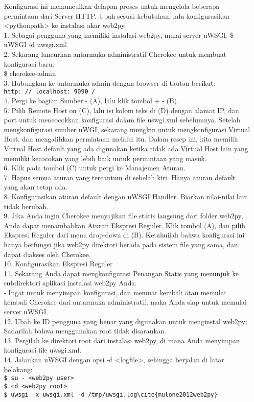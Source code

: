 \documentclass[12pt, times new roman, a4paper]{Article}
\begin{document}
	Konfigurasi ini memunculkan delapan proses untuk mengelola beberapa permintaan dari
Server HTTP. Ubah sesuai kebutuhan, lalu konfigurasikan <pythonpath> ke instalasi
akar web2py.\\
1.	Sebagai pengguna yang memiliki instalasi web2py, mulai server uWSGI: \$ uWSGI -d uwsgi.xml\\
2.	Sekarang luncurkan antarmuka administratif Cherokee untuk membuat konfigurasi baru:\\
\$ cherokee-admin\\
3.	Hubungkan ke antarmuka admin dengan browser di tautan berikut:\\
\verb|http: // localhost: 9090 /|\\
4.	Pergi ke bagian Sumber - (A), lalu klik tombol + - (B).\\
5.	Pilih Remote Host on (C), lalu isi kolom teks di (D) dengan alamat IP, dan port untuk mencocokkan konfigurasi dalam file uswgi.xml sebelumnya. Setelah mengkonfigurasi sumber uWGI, sekarang mungkin untuk mengkonfigurasi Virtual Host, dan mengalihkan permintaan melalui itu. Dalam resep ini, kita memilih Virtual Host default yang ada digunakan ketika tidak ada Virtual Host lain yang memiliki kecocokan yang lebih baik untuk permintaan yang masuk.\\
6.	Klik pada tombol (C) untuk pergi ke Manajemen Aturan.\\
7.	Hapus semua aturan yang tercantum di sebelah kiri. Hanya aturan default yang akan tetap ada.\\
8.	Konfigurasikan aturan default dengan uWSGI Handler. Biarkan nilai-nilai lain tidak berubah.\\
9.	Jika Anda ingin Cherokee menyajikan file statis langsung dari folder web2py, Anda dapat menambahkan Aturan Ekspresi Reguler. Klik tombol (A), dan pilih Ekspresi Reguler dari menu drop-down di (B). Ketahuilah bahwa konfigurasi ini hanya berfungsi jika web2py direktori berada pada sistem file yang sama, dan dapat diakses oleh Cherokee.\\
10.	Konfigurasikan Ekspresi Reguler\\
11.	Sekarang Anda dapat mengkonfigurasi Penangan Statis yang menunjuk ke subdirektori aplikasi instalasi web2py Anda:\\
-	Ingat untuk menyimpan konfigurasi, dan memuat kembali atau memulai kembali Cherokee dari antarmuka administratif; maka Anda siap untuk memulai server uWSGI.\\
12.	Ubah ke ID pengguna yang benar yang digunakan untuk menginstal web2py; Sadarilah bahwa menggunakan root tidak disarankan.\\
13.	Pergilah ke direktori root dari instalasi web2py, di mana Anda menyimpan konfigurasi file uwsgi.xml.\\
14.	Jalankan uWSGI dengan opsi -d <logfile>, sehingga berjalan di latar belakang:\\
\verb|$ su - <web2py user>|\\
\verb|$ cd <web2py root>|\\
\verb|$ uwsgi -x uwsgi.xml -d /tmp/uwsgi.log\cite{mulone2012web2py}|\\
\end{document}
